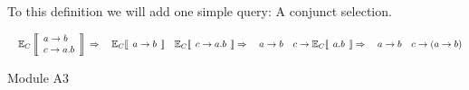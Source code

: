 \documentclass[11pt]{article}
\begin{document}
To this definition we will add one simple query: A conjunct selection.
\begin{example}[H]
$
  \hspace*{1em}
  \mathbb{E}_{C} \left \llbracket
  \begin{array}{l}
    a \rightarrow b \\
    c \rightarrow a . b 
  \end{array} \right \rrbracket \\\\
\Rightarrow \\\\
  \hspace*{1em} \mathbb{E}_{C} \llbracket \:\: a \rightarrow b \:\: \rrbracket \\
  \hspace*{1em} \mathbb{E}_{C} \llbracket \:\: c \rightarrow a.b \:\: \rrbracket \\\\
\Rightarrow \\\\
  \hspace*{1em} a \rightarrow b \\
  \hspace*{1em} c \rightarrow \mathbb{E}_{C} \llbracket \:\: a.b \:\: \rrbracket \\\\
\Rightarrow \\\\
  \hspace*{1em} a \rightarrow b \\
  \hspace*{1em} c \rightarrow (a \rightarrow b) 
$
\caption{Module A3}

\end{example}
\end{document}
